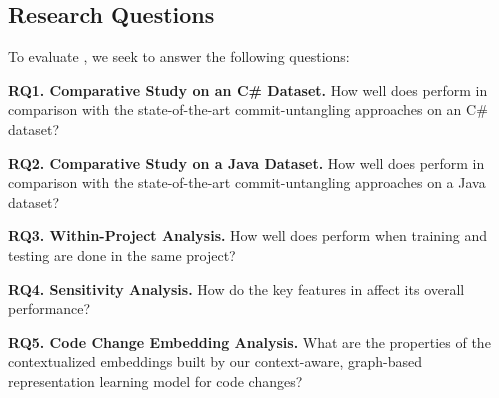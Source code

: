 \subsection{Research Questions}

To evaluate {\tool}, we seek to answer the following questions:

\noindent\textbf{RQ1. Comparative Study on an C\# Dataset.}  How well
does {\tool} perform in comparison with the state-of-the-art
commit-untangling approaches on an C\# dataset?

\noindent\textbf{RQ2. Comparative Study on a Java Dataset.}  How well
does {\tool} perform in comparison with the state-of-the-art
commit-untangling approaches on a Java dataset?

\noindent\textbf{RQ3. Within-Project Analysis.}  How well does {\tool}
perform when training and testing are done in the same project?


\noindent\textbf{RQ4. Sensitivity Analysis.} How do the key features
in {\tool} affect its overall performance?

\noindent\textbf{RQ5. Code Change Embedding Analysis.} What are the
properties of the contextualized embeddings built by our
context-aware, graph-based representation learning model for code
changes?


